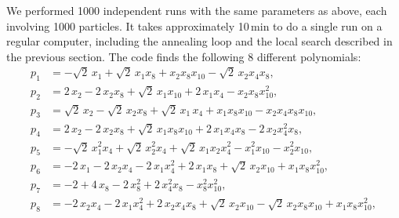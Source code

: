 \documentclass[11pt,a4paper]{article}
\begin{document}
	We performed 1000 independent runs with the same parameters as above, each involving 1000 particles. It takes approximately 10\,min to do a single run on a regular computer, including the annealing loop and the local search described in the previous section. The code finds the following 8 different polynomials:
	\begin{subequations} \label{eq:pols}
	 \begin{align}
	   p_{1} &= -\sqrt{2}\,x_{1} + \sqrt{2}\,x_{1}x_8 + x_{2}x_8x_{10} - \sqrt{2}\,x_{2}x_{4}x_8,\\[4pt]
	   p_{2} &= 2\,x_{2} - 2\,x_{2}x_8 + \sqrt{2}\,x_{1}x_{10} + 2\,x_{1}x_{4} - x_{2}x_8x_{10}^{2},\\[4pt]
	   p_{3} &= \sqrt{2}\,x_{2} - \sqrt{2}\,x_{2}x_8 + \sqrt{2}\,x_{1}\,x_{4} + x_{1}x_8x_{10}
	   		- x_{2}x_{4}x_8x_{10},\\[4pt]
	   p_{4} &= 2\,x_{2} - 2\,x_{2}x_8 + \sqrt{2}\,x_{1}x_8x_{10} + 2\,x_{1}x_{4}x_8
	   		- 2\,x_{2} x_{4}^{2}x_8,\\[4pt]
	   p_{5} &= -\sqrt{2}\,x_{1}^{2}x_{4} + \sqrt{2}\,x_{2}^{2}x_{4} + \sqrt{2}\,x_{1}x_{2}x_{4}^{2} - x_{1}^{2}x_{10}
	   		- x_{2}^{2}x_{10}, \\[4pt]
	   p_{6} &= -2\,x_{1} - 2\,x_{2}x_{4}- 2\,x_{1}x_{4}^{2} + 2\,x_{1}x_8 + \sqrt{2}\,x_{2}x_{10}
	   		+ x_{1}x_8x_{10}^{2},\\[4pt]
	   p_{7} &= -2 + 4\,x_{8} - 2\,x_8^2 + 2\,x_{4}^2 x_8 - x_8^2 x_{10}^2,\\[4pt]
	   p_{8} &= -2\,x_{2}x_{4} - 2\,x_{1}x_{4}^{2} + 2\,x_{2}x_{4}x_8 + \sqrt{2}\,x_{2}x_{10} 
	   		- \sqrt{2}\,x_{2}x_8x_{10} +  x_{1}x_8x_{10}^{2},
	 \end{align}
	\end{subequations}
\end{document}
